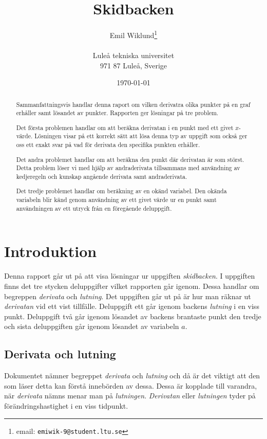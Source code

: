 \documentclass[a4paper,12pt]{article}
\title{Skidbacken}
\author{Emil Wiklund\thanks{email: \texttt{emiwik-9@student.ltu.se}}\\  
        ~ \\
        Luleå tekniska universitet \\ 
        971 87 Luleå, Sverige}
\date{\today}
\begin{document}
\linenumbers
\maketitle


\begin{abstract}
Sammanfattningsvis handlar denna raport om vilken derivatra olika
punkter på en graf erhåller samt lösandet av punkter. Rapporten ger
lösningar på tre problem. 

Det första problemen handlar om att beräkna derivatan i en punkt 
med ett givet $x$-värde. Lösningen visar på ett korrekt sätt att lösa
denna typ av uppgift som också ger oss ett exakt svar på vad för
derivata den specifika punkten erhåller.

Det andra problemet handlar om att beräkna den punkt där derivatan
är som störst. Detta problem löser vi med hjälp av andraderivata 
tillsammans med användning av kedjeregeln och kunskap angående 
derivata samt andraderivata.

Det tredje problemet handlar om beräkning av en okänd variabel.
Den okända variabeln blir känd genom användning av ett givet värde 
ur en punkt  samt användningen av ett utryck från en föregående 
deluppgift.
\end{abstract}


\section{Introduktion}
\label{sec:introduktion}


Denna rapport går ut på att visa lösningar ur uppgiften \emph{skidbacken}.
I uppgiften finns det tre stycken deluppgifter vilket rapporten går igenom.
Dessa handlar om begreppen \emph{derivata} och \emph{lutning}.
Det uppgiften går ut på är hur man räknar ut \emph{derivatan} vid ett vist 
tillfälle. Deluppgift ett går igenom backens \emph{lutning} i en viss punkt.
Deluppgift två går igenom lösandet av backens brantaste punkt den tredje 
och sista deluppgiften går igenom lösandet av variabeln $a$.
\newpage


\subsection{Derivata och lutning}


Dokumentet nämner begreppet \emph{derivata} och \emph{lutning} och då är
det viktigt att den som läser detta kan förstå innebörden av dessa. Dessa är 
kopplade till varandra, när \emph{derivata} nämns menar man på 
\emph{lutningen}. \emph{Derivatan} eller \emph{lutningen} tyder på 
förändringshastighet i en viss tidpunkt.
\end{document}
